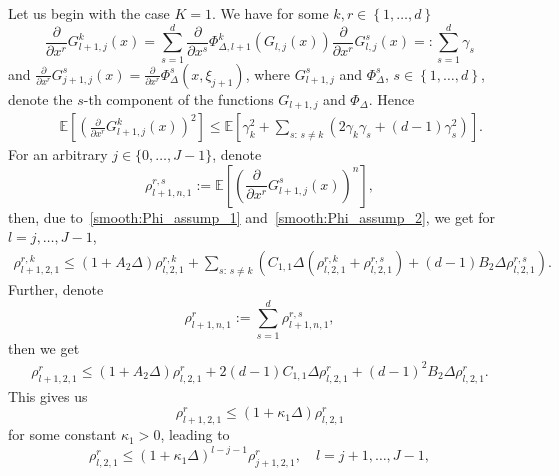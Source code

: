\documentclass[11pt,a4paper]{amsart}
\theoremstyle{plain}
\theoremstyle{definition}
\theoremstyle{remark}
\numberwithin{equation}{section}
\newcommand*{\EE}{\mathbb E}
\renewcommand*{\doteq}{:=}
\begin{document}
Let us 
begin with the case $K=1$. We have for some $k,r\in\left\{1,\ldots,d\right\}$
$$
\frac{\partial}{\partial x^r}G_{l+1,j}^k(x)=\sum_{s=1}^d\frac{\partial}{\partial x^s}\Phi_{\Delta,l+1}^{k}(G_{l,j}(x))\frac{\partial}{\partial x^r}G_{l,j}^s(x)=:\sum_{s=1}^d\gamma_s
$$
and $\frac{\partial}{\partial x^r}G_{j+1,j}^s(x)=\frac{\partial}{\partial x^r}\Phi_{\Delta}^s\left(x,\xi_{j+1}\right)$, where $G_{l+1,j}^s$ and $\Phi_\Delta^s$, $s\in\left\{1,\ldots,d\right\}$, denote the $s$-th component of the functions $G_{l+1,j}$ and $\Phi_\Delta$.
Hence 
\begin{eqnarray*}
&&\EE\left[\left(\frac{\partial}{\partial x^r}G_{l+1,j}^k(x)\right)^{2}\right]\leq\EE\left[\gamma_k^2+\sum_{s:\,s\neq k}\left(2\gamma_k\gamma_s+(d-1)\gamma_s^2\right)\right].
\end{eqnarray*}
For an arbitrary $j\in\{0,\ldots,J-1\}$, denote 
\[
\rho_{l+1,n,1}^{r,s}:=\EE\left[\left(\frac{\partial}{\partial x^r}G_{l+1,j}^s(x)\right)^{n}\right],
\]
then, due to~\eqref{smooth:Phi_assump_1} and~\eqref{smooth:Phi_assump_2}, we get for $l=j,\ldots,J-1$,
\begin{eqnarray*}
\rho_{l+1,2,1}^{r,k}  \leq  (1+A_{2}\Delta)\rho_{l,2,1}^{r,k}
+\sum_{s:\,s\neq k}\left(C_{1,1}\Delta(\rho_{l,2,1}^{r,k}+\rho_{l,2,1}^{r,s})+(d-1)B_{2}\Delta\rho_{l,2,1}^{r,s}\right).
\end{eqnarray*}
Further, denote 
\[
\rho_{l+1,n,1}^{r}:=\sum_{s=1}^d\rho_{l+1,n,1}^{r,s},
\]
then we get 
\begin{eqnarray*}
\rho_{l+1,2,1}^{r}  \leq  (1+A_{2}\Delta)\rho_{l,2,1}^{r}
+2(d-1)C_{1,1}\Delta\rho_{l,2,1}^{r}+(d-1)^2B_{2}\Delta\rho_{l,2,1}^{r}.
\end{eqnarray*}
This gives us
\[
\rho_{l+1,2,1}^{r}\leq (1+\kappa_{1}\Delta)\rho_{l,2,1}^{r}
\]
for some constant $\kappa_{1}>0$,
leading to
\begin{equation}\label{eq:13052017a1}
\rho_{l,2,1}^{r}\leq(1+\kappa_{1}\Delta)^{l-j-1}\rho_{j+1,2,1}^{r}
,\quad l=j+1,\ldots,J-1,
\end{equation}
\end{document}
